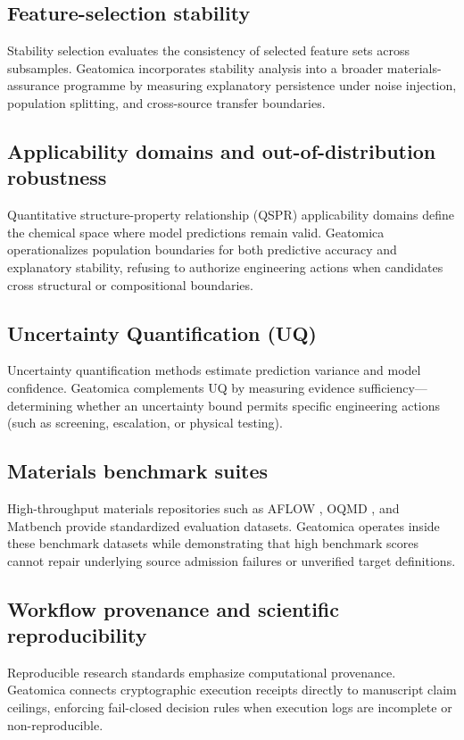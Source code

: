\documentclass[11pt,a4paper,oneside]{report}
\begin{document}
\subsection{Feature-selection stability}
Stability selection \cite{meinshausen2010stability} evaluates the consistency of selected feature sets across subsamples. Geatomica incorporates stability analysis into a broader materials-assurance programme by measuring explanatory persistence under noise injection, population splitting, and cross-source transfer boundaries.

\subsection{Applicability domains and out-of-distribution robustness}
Quantitative structure-property relationship (QSPR) applicability domains \cite{tropsha2010best} define the chemical space where model predictions remain valid. Geatomica operationalizes population boundaries for both predictive accuracy and explanatory stability, refusing to authorize engineering actions when candidates cross structural or compositional boundaries.

\subsection{Uncertainty Quantification (UQ)}
Uncertainty quantification methods \cite{abdar2021review} estimate prediction variance and model confidence. Geatomica complements UQ by measuring evidence sufficiency---determining whether an uncertainty bound permits specific engineering actions (such as screening, escalation, or physical testing).

\subsection{Materials benchmark suites}
High-throughput materials repositories such as AFLOW \cite{curtarolo2012aflowlib}, OQMD \cite{saal2013materials}, and Matbench \cite{dunn2020benchmarking} provide standardized evaluation datasets. Geatomica operates inside these benchmark datasets while demonstrating that high benchmark scores cannot repair underlying source admission failures or unverified target definitions.

\subsection{Workflow provenance and scientific reproducibility}
Reproducible research standards \cite{stodden2014implementing, goble2014better, wilkinson2016fair} emphasize computational provenance. Geatomica connects cryptographic execution receipts directly to manuscript claim ceilings, enforcing fail-closed decision rules when execution logs are incomplete or non-reproducible.
\end{document}
